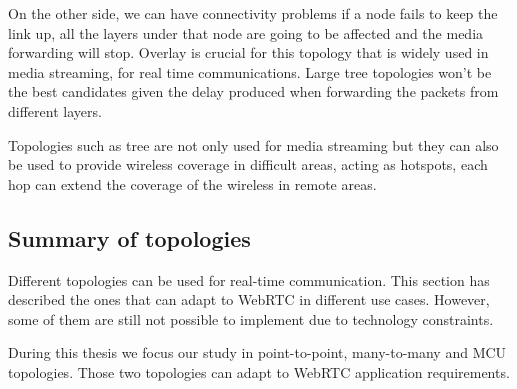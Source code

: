 On the other side, we can have connectivity problems if a node fails to keep the link up, all the layers under that node are going to be affected and the media forwarding will stop. Overlay is crucial for this topology that is widely used in media streaming, for real time communications. Large tree topologies won't be the best candidates given the delay produced when forwarding the packets from different layers.

Topologies such as tree are not only used for media streaming but they can also be used to provide wireless coverage in difficult areas, acting as hotspots, each hop can extend the coverage of the wireless in remote areas.

\subsection{Summary of topologies}

Different topologies can be used for real-time communication. This section has described the ones that can adapt to WebRTC in different use cases. However, some of them are still not possible to implement due to technology constraints. 

During this thesis we focus our study in point-to-point, many-to-many and MCU topologies. Those two topologies can adapt to WebRTC application requirements. 